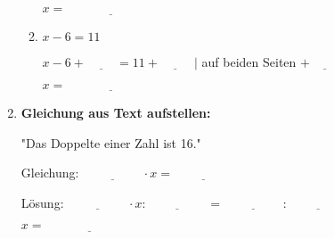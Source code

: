 \begin{enumerate}[label=\arabic*.]
\begin{enumerate}[label=\alph*)]
        $x = \underline{\hspace{3cm}}$

        \vspace{0.5cm}

        \item $x - 6 = 11$

        $x - 6 + \underline{\hspace{1cm}} = 11 + \underline{\hspace{1cm}}$ \hspace{1cm} $|$ auf beiden Seiten $+\underline{\hspace{1cm}}$

        $x = \underline{\hspace{3cm}}$
    \end{enumerate}

    \vspace{1cm}

    \item \textbf{Gleichung aus Text aufstellen:}
    \vspace{0.5cm}

    "Das Doppelte einer Zahl ist 16."

    Gleichung: $\underline{\hspace{2cm}} \cdot x = \underline{\hspace{2cm}}$

    Lösung: $\underline{\hspace{2cm}} \cdot x : \underline{\hspace{2cm}} = \underline{\hspace{2cm}} : \underline{\hspace{2cm}}$

    $x = \underline{\hspace{3cm}}$
\end{enumerate}